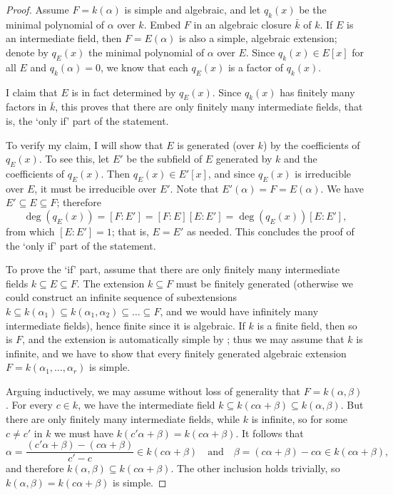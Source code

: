 \begin{proof}
  Assume $F = k(\alpha)$ is simple and algebraic, and let $q_k(x)$ be
  the minimal polynomial of $\alpha$ over $k$. Embed $F$ in an
  algebraic closure $\bar{k}$ of $k$. If $E$ is an intermediate field,
  then $F = E(\alpha)$ is also a simple, algebraic extension; denote
  by $q_E(x)$ the minimal polynomial of $\alpha$ over $E$. Since
  $q_k(x) \in E[x]$ for all $E$ and $q_k(\alpha) = 0$, we know that
  each $q_E(x)$ is a factor of $q_k(x)$.

  I claim that $E$ is in fact determined by $q_E(x)$. Since $q_k(x)$
  has finitely many factors in $\bar{k}$, this proves that there are
  only finitely many intermediate fields, that is, the `only if' part
  of the statement.

  To verify my claim, I will show that $E$ is generated (over $k$) by
  the coefficients of $q_E(x)$. To see this, let $E'$ be the subfield
  of $E$ generated by $k$ and the coefficients of $q_E(x)$. Then
  $q_E(x) \in E'[x]$, and since $q_E(x)$ is irreducible over $E$, it
  must be irreducible over $E'$. Note that
  $E'(\alpha) = F = E(\alpha)$. We have $E' \subseteq E \subseteq F$;
  therefore
  \[
    \deg(q_E(x)) = [F : E'] = [F : E][E : E'] = \deg(q_E(x))[E : E'],
  \]
  from which $[E : E'] = 1$; that is, $E = E'$ as needed. This
  concludes the proof of the `only if' part of the statement.

  To prove the `if' part, assume that there are only finitely many
  intermediate fields $k \subseteq E \subseteq F$. The extension
  $k \subseteq F$ must be finitely generated (otherwise we could
  construct an infinite sequence of subextensions
  $k \subseteq k(\alpha_1) \subseteq k(\alpha_1, \alpha_2) \subseteq
  \dots \subseteq F$, and we would have infinitely many intermediate
  fields), hence finite since it is algebraic.  If $k$ is a finite
  field, then so is $F$, and the extension is automatically simple by
  ; thus we may assume that $k$ is infinite, and
  we have to show that every finitely generated algebraic extension
  $F = k(\alpha_1, \dots, \alpha_r)$ is simple.

  Arguing inductively, we may assume without loss of generality that
  $F = k(\alpha, \beta)$. For every $c \in k$, we have the
  intermediate field
  $k \subseteq k(c\alpha + \beta) \subseteq k(\alpha, \beta)$. But
  there are only finitely many intermediate fields, while $k$ is
  infinite, so for some $c \neq c'$ in $k$ we must have
  $k(c'\alpha + \beta) = k(c\alpha + \beta)$. It follows that
  \[
    \alpha = \frac{(c'\alpha + \beta) - (c\alpha + \beta)}{c' - c} \in
    k(c\alpha + \beta) \quad\text{and}\quad \beta = (c\alpha + \beta)
    - c\alpha \in k(c\alpha + \beta),
  \]
  and therefore $k(\alpha, \beta) \subseteq k(c\alpha + \beta)$. The
  other inclusion holds trivially, so
  $k(\alpha, \beta) = k(c\alpha + \beta)$ is simple.
\end{proof}
